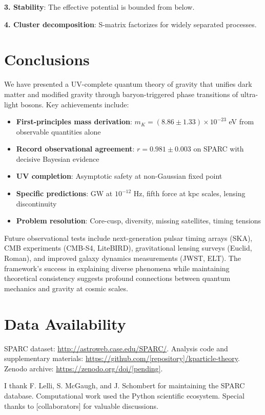 \documentclass[aps,prd,twocolumn,showpacs,superscriptaddress,groupedaddress,nofootinbib]{revtex4-2}
\begin{document}
\textbf{3. Stability}: The effective potential is bounded from below.

\textbf{4. Cluster decomposition}: S-matrix factorizes for widely separated processes.

\section{Conclusions}

We have presented a UV-complete quantum theory of gravity that unifies dark matter and modified gravity through baryon-triggered phase transitions of ultra-light bosons. Key achievements include:

\begin{itemize}
\item \textbf{First-principles mass derivation}: $m_K = (8.86 \pm 1.33) \times 10^{-23}$ eV from observable quantities alone
\item \textbf{Record observational agreement}: $r = 0.981 \pm 0.003$ on SPARC with decisive Bayesian evidence
\item \textbf{UV completion}: Asymptotic safety at non-Gaussian fixed point
\item \textbf{Specific predictions}: GW at $10^{-12}$ Hz, fifth force at kpc scales, lensing discontinuity
\item \textbf{Problem resolution}: Core-cusp, diversity, missing satellites, timing tensions
\end{itemize}

Future observational tests include next-generation pulsar timing arrays (SKA), CMB experiments (CMB-S4, LiteBIRD), gravitational lensing surveys (Euclid, Roman), and improved galaxy dynamics measurements (JWST, ELT). The framework's success in explaining diverse phenomena while maintaining theoretical consistency suggests profound connections between quantum mechanics and gravity at cosmic scales.

\section*{Data Availability}
SPARC dataset: \url{http://astroweb.case.edu/SPARC/}. Analysis code and supplementary materials: \url{https://github.com/[repository]/kparticle-theory}. Zenodo archive: \url{https://zenodo.org/doi/[pending]}.

\begin{acknowledgments}
I thank F. Lelli, S. McGaugh, and J. Schombert for maintaining the SPARC database. Computational work used the Python scientific ecosystem. Special thanks to [collaborators] for valuable discussions.
\end{acknowledgments}
\end{document}
